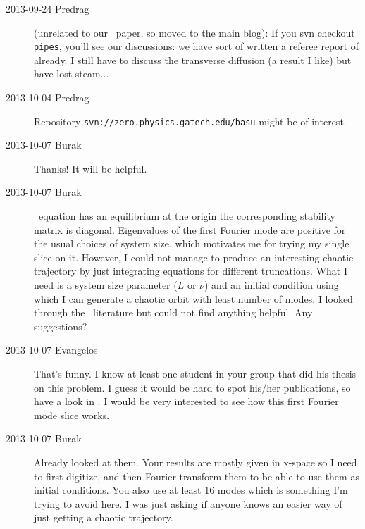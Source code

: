 \begin{description}
\item[2013-09-24 Predrag] (unrelated to our \twoMode\ paper, so moved
    to the main blog): If you svn checkout \texttt{pipes}, you'll see our
    discussions: we have sort of written a referee report of
     already. I still have to discuss the transverse
    diffusion (a result I like) but have lost steam...

\item[2013-10-04 Predrag]
Repository \texttt{svn://zero.physics.gatech.edu/basu} might be of interest.

\item[2013-10-07 Burak] Thanks! It will be helpful.

\item[2013-10-07 Burak] \KS\ equation has an equilibrium at the origin the
corresponding stability matrix is diagonal. Eigenvalues of the first Fourier
mode are positive for the usual choices of system size, which motivates me
for trying my single slice on it. However, I could not manage to produce an
interesting chaotic trajectory by just integrating equations for different
truncations. What I need is a system size parameter ($L$ or $\nu$) and an
initial condition using which I can generate a chaotic orbit with least
number of modes. I looked through the \KS\ literature but could not find
anything helpful. Any suggestions?

\item[2013-10-07 Evangelos] That's funny. I know at least one student in your
group that did his thesis on this problem. I guess it would be hard to spot
his/her publications, so have a look in .
I would be very interested to see how this first Fourier mode slice works.

\item[2013-10-07 Burak] Already looked at them. Your results are mostly
given in x-space so I need to first digitize, and then Fourier transform
them to be able to use them as initial conditions. You also use at least
16 modes which is something I'm trying to avoid here. I was just asking
if anyone knows an easier way of just getting a chaotic trajectory.


\end{description}
